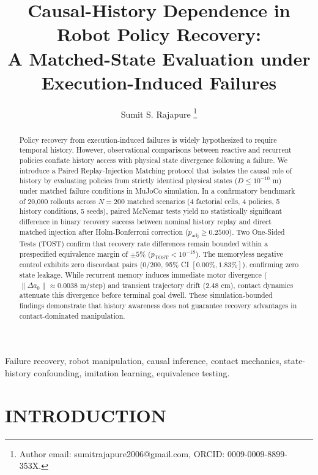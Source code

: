 \documentclass[letterpaper, 10 pt, conference]{ieeeconf}
\title{\LARGE \bf
Causal-History Dependence in Robot Policy Recovery: \\
A Matched-State Evaluation under Execution-Induced Failures
}
\author{Sumit S. Rajapure%
\thanks{Author email: sumitrajapure2006@gmail.com, ORCID: 0009-0009-8899-353X.}%
}
\begin{document}
\maketitle
\thispagestyle{empty}
\pagestyle{empty}

\begin{abstract}
Policy recovery from execution-induced failures is widely hypothesized to require temporal history. However, observational comparisons between reactive and recurrent policies conflate history access with physical state divergence following a failure. We introduce a Paired Replay-Injection Matching protocol that isolates the causal role of history by evaluating policies from strictly identical physical states ($D \le 10^{-10}\text{ m}$) under matched failure conditions in MuJoCo simulation. In a confirmatory benchmark of 20,000 rollouts across $N=200$ matched scenarios (4 factorial cells, 4 policies, 5 history conditions, 5 seeds), paired McNemar tests yield no statistically significant difference in binary recovery success between nominal history replay and direct matched injection after Holm-Bonferroni correction ($p_{\text{adj}} \ge 0.2500$). Two One-Sided Tests (TOST) confirm that recovery rate differences remain bounded within a prespecified equivalence margin of $\pm 5\%$ ($p_{\text{TOST}} < 10^{-18}$). The memoryless negative control exhibits zero discordant pairs ($0/200$, 95\% CI $[0.00\%, 1.83\%]$), confirming zero state leakage. While recurrent memory induces immediate motor divergence ($\|\Delta a_0\| \approx 0.0038\text{ m/step}$) and transient trajectory drift ($2.48\text{ cm}$), contact dynamics attenuate this divergence before terminal goal dwell. These simulation-bounded findings demonstrate that history awareness does not guarantee recovery advantages in contact-dominated manipulation.
\end{abstract}

\begin{keywords}
Failure recovery, robot manipulation, causal inference, contact mechanics, state-history confounding, imitation learning, equivalence testing.
\end{keywords}

\section{INTRODUCTION}
\label{sec:introduction}
\end{document}
